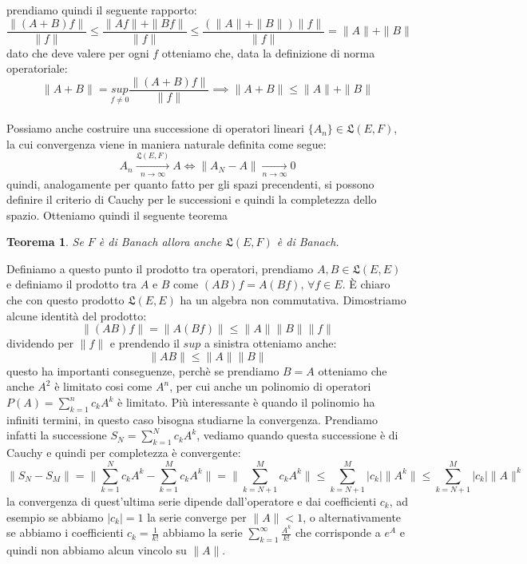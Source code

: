 \documentclass[12pt]{book}
\theoremstyle{plain}
\newtheorem{thm}{Teorema}[section]
\theoremstyle{definition}
\theoremstyle{remark}
\begin{document}
prendiamo quindi il seguente rapporto:
\[\frac{\|(A+B)f\|}{\|f\|}\leq \frac{\|Af\|+\|Bf\|}{\|f\|}\leq \frac{(\|A\|+\|B\|)\|f\|}{\|f\|} = \|A\|+\|B\|\]
dato che deve valere per ogni $f$ otteniamo che, data la definizione di norma operatoriale:
\[\|A+B\| = \underset{f\neq0}{sup}\frac{\|(A+B)f\|}{\|f\|}\implies \|A+B\|\leq \|A\|+\|B\|\]
\\
Possiamo anche costruire una successione di operatori lineari $\{A_n\}\in \mathfrak{L}(E,F)$, la cui convergenza viene in maniera naturale definita come segue:
\[A_n \xrightarrow[n\to \infty]{\mathfrak{L}(E,F)} A \iff \|A_N - A\|\xrightarrow[n\to \infty]{} 0 \] 
quindi, analogamente per quanto fatto per gli spazi precendenti, si possono definire il criterio di Cauchy per le successioni e quindi la completezza dello spazio. Otteniamo quindi il seguente teorema
\begin{thm}
Se $F$ è di Banach allora anche $\mathfrak{L}(E,F)$ è di Banach.
\end{thm}
\hspace{-1.6em}Definiamo a questo punto il prodotto tra operatori, prendiamo $A,B\in\mathfrak{L}(E,E)$ e definiamo il prodotto tra $A$ e $B$ come $(AB)f = A(Bf),\,\forall f\in E$. È chiaro che con questo prodotto $\mathfrak{L}(E,E)$ ha un algebra non commutativa. Dimostriamo alcune identità del prodotto:
\[\|(AB)f\| = \|A(Bf)\| \leq \|A\|\|B\|\|f\|\]
dividendo per $\|f\|$ e prendendo il $sup$ a sinistra otteniamo anche:
\[\|AB\| \leq \|A\|\|B\|\]
questo ha importanti conseguenze, perchè se prendiamo $B=A$ otteniamo che anche $A^2$ è limitato cosi come $A^n$, per cui anche un polinomio di operatori $P(A) = \sum_{k=1}^{n}c_k A^k$ è limitato. Più interessante è quando il polinomio ha infiniti termini, in questo caso bisogna studiarne la convergenza. Prendiamo infatti la successione $S_N = \sum_{k=1}^{N}c_k A^k $, vediamo quando questa successione è di Cauchy e quindi per completezza è convergente:
\[\|S_N -S_M\| = \| \sum_{k=1}^{N}c_k A^k -  \sum_{k=1}^{M}c_k A^k\| = \|\sum_{k=N+1}^{M}c_k A^k\| \leq \sum_{k=N+1}^{M} |c_k|\|A^k\| \leq \sum_{k=N+1}^{M} |c_k|\|A\|^k\]
la convergenza di quest'ultima serie dipende dall'operatore e dai coefficienti $c_k$, ad esempio se abbiamo $|c_k|=1$ la serie converge per $\|A\|<1$, o alternativamente se abbiamo i coefficienti $c_k = \frac{1}{k!}$ abbiamo la serie $\sum_{k=1}^\infty\frac{A^k}{k!}$ che corrisponde a $e^A$ e quindi non abbiamo alcun vincolo su $\|A\|$.
\end{document}
